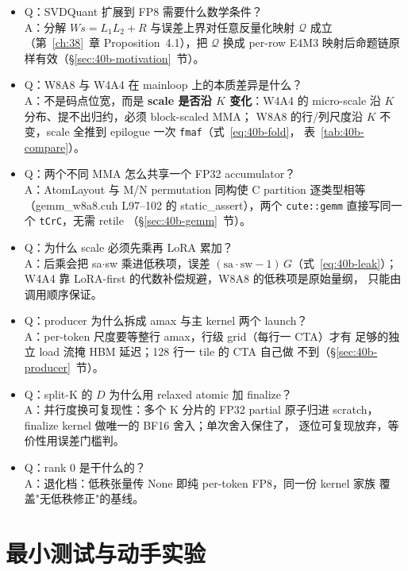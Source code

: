 \begin{itemize}[itemsep=1pt,topsep=2pt]
  \item Q：SVDQuant 扩展到 FP8 需要什么数学条件？\\
        A：分解 $W s=L_1L_2+R$ 与误差上界对任意反量化映射 $\mathcal Q$
        成立（第~\ref{ch:38}~章 Proposition~4.1），把 $\mathcal Q$ 换成
        per-row E4M3 映射后命题链原样有效（\S\ref{sec:40b-motivation}~节）。
  \item Q：W8A8 与 W4A4 在 mainloop 上的本质差异是什么？\\
        A：不是码点位宽，而是 \textbf{scale 是否沿 $K$ 变化}：W4A4 的
        micro-scale 沿 $K$ 分布、提不出归约，必须 block-scaled MMA；
        W8A8 的行/列尺度沿 $K$ 不变，scale 全推到 epilogue 一次
        \texttt{fmaf}（式~\eqref{eq:40b-fold}，
        表~\ref{tab:40b-compare}）。
  \item Q：两个不同 MMA 怎么共享一个 FP32 accumulator？\\
        A：AtomLayout 与 M/N permutation 同构使 C partition 逐类型相等
        （gemm\_w8a8.cuh L97--102 的 static\_assert），两个
        \texttt{cute::gemm} 直接写同一个 \texttt{tCrC}，无需 retile
        （\S\ref{sec:40b-gemm}~节）。
  \item Q：为什么 scale 必须先乘再 LoRA 累加？\\
        A：后乘会把 sa$\cdot$sw 乘进低秩项，误差
        $(\mathrm{sa}\cdot\mathrm{sw}-1)\,G$（式~\eqref{eq:40b-leak}）；
        W4A4 靠 LoRA-first 的代数补偿规避，W8A8 的低秩项是原始量纲，
        只能由调用顺序保证。
  \item Q：producer 为什么拆成 amax 与主 kernel 两个 launch？\\
        A：per-token 尺度要等整行 amax，行级 grid（每行一 CTA）才有
        足够的独立 load 流掩 HBM 延迟；128 行一 tile 的 CTA 自己做
        不到（\S\ref{sec:40b-producer}~节）。
  \item Q：split-K 的 $D$ 为什么用 relaxed atomic 加 finalize？\\
        A：并行度换可复现性：多个 K 分片的 FP32 partial 原子归进
        scratch，finalize kernel 做唯一的 BF16 舍入；单次舍入保住了，
        逐位可复现放弃，等价性用误差门槛判。
  \item Q：rank 0 是干什么的？\\
        A：退化档：低秩张量传 None 即纯 per-token FP8，同一份 kernel 家族
        覆盖"无低秩修正"的基线。
\end{itemize}

\section{最小测试与动手实验}

